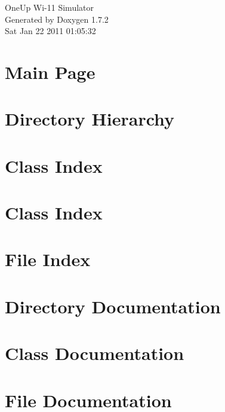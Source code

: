 \documentclass[a4paper]{book}
\begin{document}
\hypersetup{pageanchor=false}
\begin{titlepage}
\vspace*{7cm}
\begin{center}
{\Large OneUp Wi-\/11 Simulator }\\
\vspace*{1cm}
{\large Generated by Doxygen 1.7.2}\\
\vspace*{0.5cm}
{\small Sat Jan 22 2011 01:05:32}\\
\end{center}
\end{titlepage}
\clearemptydoublepage
{}
\tableofcontents
\clearemptydoublepage
{}
\hypersetup{pageanchor=true}
\chapter{Main Page}
\label{index}\hypertarget{index}{}
\chapter{Directory Hierarchy}

\chapter{Class Index}

\chapter{Class Index}

\chapter{File Index}

\chapter{Directory Documentation}



\chapter{Class Documentation}
















\chapter{File Documentation}




\printindex
\end{document}
